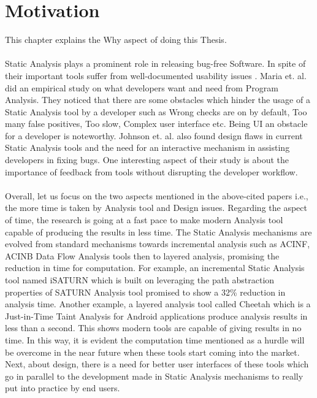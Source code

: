 \chapter{Motivation}
\label{ch:motivation}

This chapter explains the Why aspect of doing this Thesis. \\ \\

Static Analysis plays a prominent role in releasing bug-free Software. In spite of their important tools suffer from well-documented usability issues \cite{CB16,JSMB13}.  Maria et. al. \cite{CB16} did an empirical study on what developers want and need from Program Analysis. They noticed that there are some obstacles which hinder the usage of a Static Analysis tool by a developer such as Wrong checks are on by default, Too many false positives, Too slow,  Complex user interface etc. Being UI an obstacle for a developer is noteworthy. Johnson et. al. \cite{JSMB13} also found design flaws in current Static Analysis tools and the need for an interactive mechanism in assisting developers in fixing bugs. One interesting aspect of their study is about the importance of feedback from tools without disrupting the developer workflow. \\ \\

Overall, let us focus on the two aspects mentioned in the above-cited papers i.e., the more time is taken by Analysis tool and Design issues. Regarding the aspect of time, the research is going at a fast pace to make modern Analysis tool capable of producing the results in less time. The Static Analysis mechanisms are evolved from standard mechanisms towards incremental analysis such as ACINF, ACINB Data Flow Analysis tools then to layered analysis, promising the reduction in time for computation. For example,  an incremental Static Analysis tool named iSATURN \cite{iSaturn} which is built on leveraging the path abstraction properties of SATURN \cite{Xie} Analysis tool promised to show a 32\% reduction in analysis time. Another example, a layered analysis tool called Cheetah \cite{JIT} which is a Just-in-Time Taint Analysis for Android applications produce analysis results in less than a second. This shows modern tools are capable of giving results in no time. In this way, it is evident the computation time mentioned as a hurdle will be overcome in the near future when these tools start coming into the market. Next, about design, there is a need for better user interfaces of these tools which go in parallel to the development made in Static Analysis mechanisms to really put into practice by end users. \\ \\

